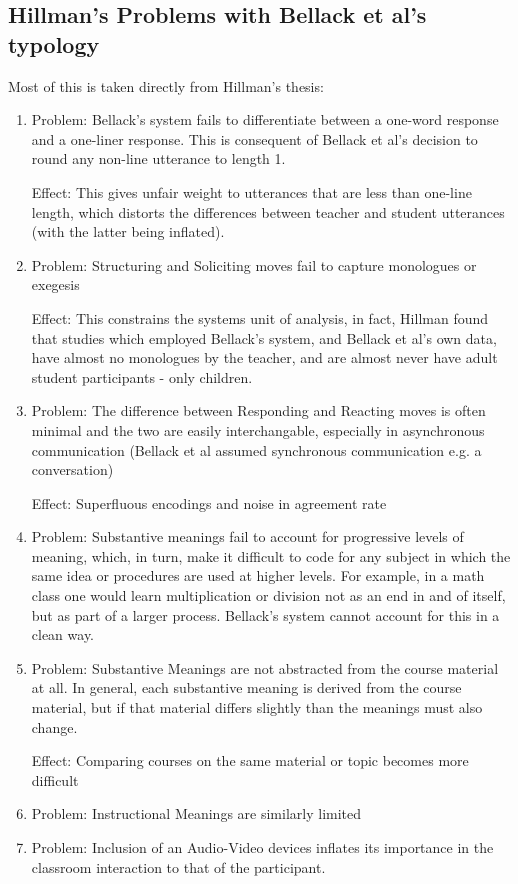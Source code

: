 \documentclass[10pt, letterpaper]{article}
\begin{document}
\subsection*{Hillman's Problems with Bellack et al's typology}
\label{sec:org3a40c3d}
Most of this is taken directly from Hillman's thesis:
\begin{enumerate}
\item Problem: Bellack's system fails to differentiate between a one-word
response and a one-liner response. This is consequent of Bellack et al's
decision to round any non-line utterance to length 1.

Effect: This gives unfair weight to utterances that are less than one-line
length, which distorts the differences between teacher and student
utterances (with the latter being inflated).
\item Problem: Structuring and Soliciting moves fail to capture monologues or exegesis

Effect: This constrains the systems unit of analysis, in fact, Hillman
found that studies which employed Bellack's system, and Bellack et al's
own data, have almost no monologues by the teacher, and are almost never
have adult student participants - only children.
\item Problem: The difference between Responding and Reacting moves is often
minimal and the two are easily interchangable, especially in asynchronous
communication (Bellack et al assumed synchronous communication e.g. a
conversation)

Effect: Superfluous encodings and noise in agreement rate
\item Problem: Substantive meanings fail to account for progressive levels of
meaning, which, in turn, make it difficult to code for any subject in
which the same idea or procedures are used at higher levels. For example,
in a math class one would learn multiplication or division not as an end
in and of itself, but as part of a larger process. Bellack's system cannot
account for this in a clean way.
\item Problem: Substantive Meanings are not abstracted from the course material
at all. In general, each substantive meaning is derived from the course
material, but if that material differs slightly than the meanings must
also change.

Effect: Comparing courses on the same material or topic becomes more
difficult
\item Problem: Instructional Meanings are similarly limited
\item Problem: Inclusion of an Audio-Video devices inflates its importance in
the classroom interaction to that of the participant. 


\end{enumerate}
\end{document}
